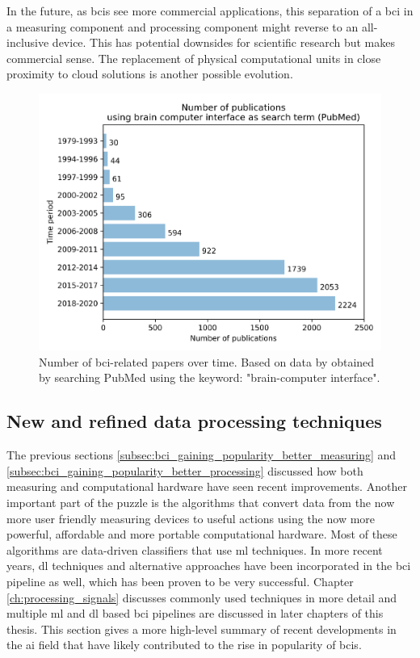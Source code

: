In the future, as \glspl{bci} see more commercial applications, this separation of a \gls{bci} in a measuring component and processing component might reverse to an all-inclusive device.
This has potential downsides for scientific research but makes commercial sense.
The replacement of physical computational units in close proximity to cloud solutions is another possible evolution.

\begin{figure}[ht]
    \centering
    \includegraphics[width=0.8\linewidth]{../images/introduction/papers_on_bci.pdf}
    \captionsetup{width=0.7\linewidth}
    \captionsetup{justification=centering}
    \caption{Number of \gls{bci}-related papers over time. Based on data by \citet{bci_progress_overview} obtained by searching PubMed using the keyword: "brain-computer interface".}
    \label{fig:bci_publications}
\end{figure}



\subsection{New and refined data processing techniques}
\label{subsec:bci_gaining_popularity_improved_data_processing}


The previous sections \ref{subsec:bci_gaining_popularity_better_measuring} and \ref{subsec:bci_gaining_popularity_better_processing} discussed how both measuring and computational hardware have seen recent improvements.
Another important part of the puzzle is the algorithms that convert data from the now more user friendly measuring devices to useful actions using the now more powerful, affordable and more portable computational hardware.
Most of these algorithms are data-driven classifiers that use \gls{ml} techniques.
In more recent years, \gls{dl} techniques and alternative approaches have been incorporated in the \gls{bci} pipeline as well, which has been proven to be very successful. 
Chapter \ref{ch:processing_signals} discusses commonly used techniques in more detail and multiple \gls{ml} and \gls{dl} based \gls{bci} pipelines are discussed in later chapters of this thesis.
This section gives a more high-level summary of recent developments in the \gls{ai} field that have likely contributed to the rise in popularity of \glspl{bci}.

